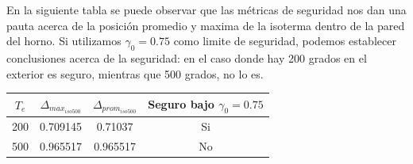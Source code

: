 \vspace{0.5cm}

En la siguiente tabla se puede observar que las métricas de seguridad nos dan una pauta acerca de la posición promedio y maxima de la isoterma dentro de la pared del horno. Si utilizamos $\gamma_0 = 0.75$ como limite de seguridad, podemos establecer conclusiones acerca de la seguridad: en el caso donde hay 200 grados en el exterior es seguro, mientras que 500 grados, no lo es.

\begin{center}
	\begin{tabular}{| c | c | c | c |}
	 	\hline
	 	$T_e$ & $\Delta_{max_{iso500}}$ & $\Delta_{prom_{iso500}}$ & Seguro bajo $\gamma_0 = 0.75$\\
	 	\hline			
		200 & 0.709145 & 0.71037 & Si\\
		\hline
		500 & 0.965517 & 0.965517 & No\\
		\hline  
	\end{tabular}
\end{center}
